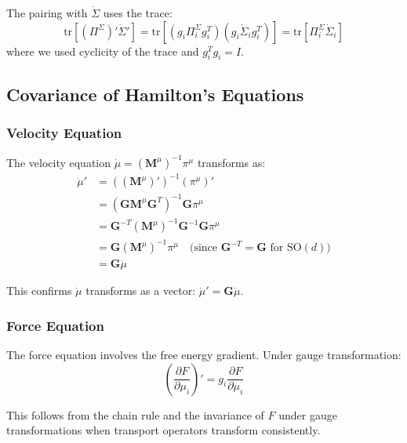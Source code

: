 \documentclass[12pt]{article}
\begin{document}
The pairing with $\dot{\Sigma}$ uses the trace:
\begin{equation}
\mathrm{tr}[(\Pi^\Sigma)'\dot{\Sigma}'] = \mathrm{tr}[(g_i\Pi_i^\Sigma g_i^T)(g_i\dot{\Sigma}_i g_i^T)] = \mathrm{tr}[\Pi_i^\Sigma\dot{\Sigma}_i]
\end{equation}
where we used cyclicity of the trace and $g_i^T g_i = I$.

\subsection{Covariance of Hamilton's Equations}

\subsubsection{Velocity Equation}

The velocity equation $\dot{\mu} = (\mathbf{M}^\mu)^{-1}\pi^\mu$ transforms as:
\begin{align}
\dot{\mu}' &= ((\mathbf{M}^\mu)')^{-1}(\pi^\mu)' \nonumber\\
&= (\mathbf{G}\mathbf{M}^\mu\mathbf{G}^T)^{-1}\mathbf{G}\pi^\mu \nonumber\\
&= \mathbf{G}^{-T}(\mathbf{M}^\mu)^{-1}\mathbf{G}^{-1}\mathbf{G}\pi^\mu \nonumber\\
&= \mathbf{G}(\mathbf{M}^\mu)^{-1}\pi^\mu \quad \text{(since } \mathbf{G}^{-T} = \mathbf{G} \text{ for SO}(d)\text{)} \nonumber\\
&= \mathbf{G}\dot{\mu}
\end{align}

This confirms $\dot{\mu}$ transforms as a vector: $\dot{\mu}' = \mathbf{G}\dot{\mu}$.

\subsubsection{Force Equation}

The force equation involves the free energy gradient. Under gauge transformation:
\begin{equation}
\left(\frac{\partial F}{\partial\mu_i}\right)' = g_i \frac{\partial F}{\partial\mu_i}
\end{equation}

This follows from the chain rule and the invariance of $F$ under gauge transformations when transport operators transform consistently.
\end{document}
